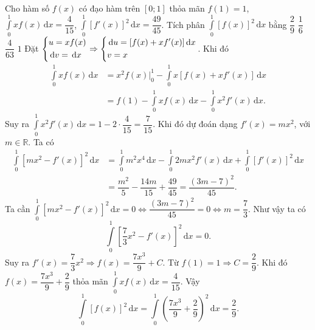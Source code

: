 \begin{ex}%
Cho hàm số $f(x)$ có đạo hàm trên $[0;1]$ thỏa mãn $f(1)=1$, $\displaystyle\int\limits_0^1xf(x)\mathrm{\, d}x=\dfrac{4}{15}$, $\displaystyle\int\limits_0^1[f'(x)]^2\mathrm{\, d}x=\dfrac{49}{45}$. Tích phân $\displaystyle\int\limits_0^1[f(x)]^2\mathrm{\, d}x$ bằng
\choice
{\True $\dfrac{2}{9}$}
{$\dfrac{1}{6}$}
{$\dfrac{4}{63}$}
{$1$}
\loigiai
{Đặt $\left\{\begin{aligned}&u=xf(x)\\&\mathrm{\, d}v=\mathrm{\, d}x\end{aligned}\right.\Rightarrow\left\{\begin{aligned}&\mathrm{\, d}u=[f(x)+xf'(x)]\mathrm{\, d}x\\&v=x\end{aligned}\right.$. Khi đó
$$\begin{aligned}\displaystyle\int\limits_0^1xf(x)\mathrm{\, d}x&=x^2f(x)\Big|_0^1-\displaystyle\int\limits_0^1x[f(x)+xf'(x)]\mathrm{\, d}x\\
&=f(1)-\displaystyle\int\limits_0^1xf(x)\mathrm{\, d}x-\displaystyle\int\limits_0^1x^2f'(x)\mathrm{\, d}x.
\end{aligned}$$
Suy ra $\displaystyle\int\limits_0^1x^2f'(x)\mathrm{\, d}x=1-2\cdot\dfrac{4}{15}=\dfrac{7}{15}$.
Khi đó dự đoán dạng $f'(x)=mx^2$, với $m\in\mathbb{R}$. Ta có
$$\begin{aligned}\displaystyle\int\limits_0^1[mx^2-f'(x)]^2\mathrm{\, d}x&=\displaystyle\int\limits_0^1m^2x^4\mathrm{\, d}x
-\displaystyle\int\limits_0^{1}2mx^2f'(x)\mathrm{\, d}x+\displaystyle\int\limits_0^1[f'(x)]^2\mathrm{\, d}x\\
&=\dfrac{m^2}{5}-\dfrac{14m}{15}+\dfrac{49}{45}=\dfrac{(3m-7)^2}{45}.
\end{aligned}$$
Ta cần $\displaystyle\int\limits_0^1[mx^2-f'(x)]^2\mathrm{\, d}x=0\Leftrightarrow\dfrac{(3m-7)^2}{45}=0\Leftrightarrow m=\dfrac{7}{3}$. Như vậy ta có
$$\displaystyle\int\limits_0^1\left[\dfrac{7}{3}x^2-f'(x)\right]^2\mathrm{\, d}x=0.$$
Suy ra $f'(x)=\dfrac{7}{3}x^2\Rightarrow f(x)=\dfrac{7x^3}{9}+C$. Từ $f(1)=1\Rightarrow C=\dfrac{2}{9}$. Khi đó $f(x)=\dfrac{7x^3}{9}+\dfrac{2}{9}$ thỏa mãn $\displaystyle\int\limits_0^1xf(x)\mathrm{\, d}x=\dfrac{4}{15}$. Vậy
$$\displaystyle\int\limits_0^1[f(x)]^2\mathrm{\, d}x=\displaystyle\int\limits_0^1\left(\dfrac{7x^3}{9}+\dfrac{2}{9}\right)^2\mathrm{\, d}x=\dfrac{2}{9}.$$
}
\end{ex}
